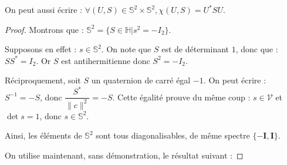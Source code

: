 \begin{rema}
On peut aussi \'ecrire : $\forall (U,S)\in\mathbb{S}^2\times\mathbb{S}^2 , \chi(U,S)=U^{\ast}SU$.
\end{rema}

\begin{proof}
Montrons que : $\mathbb{S}^2=\{S\in\mathbb{H}|s^2=-I_2\}$.
\par
Supposons en effet : $s\in\mathbb{S}^2$. On note que $S$ est de d\'eterminant $1$, donc que : $SS^{\ast}=I_2$. Or $S$ est antihermitienne donc $S^2=-I_2$.
\par
R\'eciproquement, soit $S$ un quaternion de carr\'e \'egal  $-1$. On peut \'ecrire : $S^{-1}=-S$, donc $\dfrac{S^{\ast}}{\|c\|^2}=-S$. %
Cette \'egalit\'e prouve du m\^eme coup : $s\in\mathcal{V}$ et $\det s=1$, donc $s\in\mathbb{S}^2$.
\par
Ainsi, les \'el\'ements de $\mathbb{S}^2$ sont tous diagonalisables, de m\^eme spectre $\{-\mathbf{I},\mathbf{I}\}$.
\par
On utilise maintenant, sans d\'emonstration, le r\'esultat suivant :


\end{proof}
